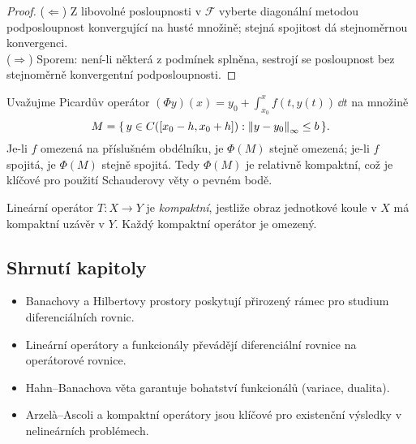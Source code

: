 \begin{proof}
($\Leftarrow$) Z libovolné posloupnosti v $\mathcal{F}$ vyberte diagonální metodou podposloupnost konvergující na husté množině; stejná spojitost dá stejnoměrnou konvergenci.\\
($\Rightarrow$) Sporem: není-li některá z podmínek splněna, sestrojí se posloupnost bez stejnoměrně konvergentní podposloupnosti.
\end{proof}

\begin{example}
\label{ex:aplikace-arzela}
Uvažujme Picardův operátor $(\Phi y)(x)=y_0+\int_{x_0}^x f(t,y(t))\,\dd t$ na množině
\[
M=\{\,y\in C([x_0-h,x_0+h]) : \left\lVert y-y_0 \right\rVert_\infty\le b\,\}.
\]
Je-li $f$ omezená na příslušném obdélníku, je $\Phi(M)$ stejně omezená; je-li $f$ spojitá, je $\Phi(M)$ stejně spojitá. Tedy $\Phi(M)$ je relativně kompaktní, což je klíčové pro použití Schauderovy věty o pevném bodě.
\end{example}

\begin{theorem}
\label{vet:kompaktni-operatory}
Lineární operátor $T:X\to Y$ je \emph{kompaktní}, jestliže obraz jednotkové koule v $X$ má kompaktní uzávěr v $Y$. Každý kompaktní operátor je omezený.
\end{theorem}

\spc

\subsection*{Shrnutí kapitoly}
\begin{itemize}
\item Banachovy a Hilbertovy prostory poskytují přirozený rámec pro studium diferenciálních rovnic.
\item Lineární operátory a funkcionály převádějí diferenciální rovnice na operátorové rovnice.
\item Hahn–Banachova věta garantuje bohatství funkcionálů (variace, dualita).
\item Arzelà–Ascoli a kompaktní operátory jsou klíčové pro existenční výsledky v nelineárních problémech.
\end{itemize}

\spc

